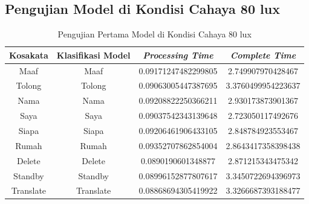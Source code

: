 \subsection{Pengujian Model di Kondisi Cahaya 80 lux}
\label{sec:analisiscahaya2}

\begin{longtable}{|c|c|c|c|}
  \caption{Pengujian Pertama Model di Kondisi Cahaya 80 lux}
  \label{tb:prediksiremang1}                                   \\
  \hline
  \rowcolor[HTML]{C0C0C0}
  \textbf{Kosakata} & \textbf{Klasifikasi Model} & \textbf{\emph{Processing Time}} & \textbf{\emph{Complete Time}}\\
  \hline
  Maaf              & Maaf                        & 0.09171247482299805                           & 2.749907970428467                                  \\
  Tolong            & Tolong                        & 0.09063005447387695                           & 3.3760499954223637                                  \\
  Nama              & Nama                        & 0.09208822250366211                           & 2.930173873901367                                  \\
  Saya              & Saya                        & 0.09037542343139648                           & 2.723050117492676                                  \\
  Siapa              & Siapa                        & 0.09206461906433105                           & 2.848784923553467                                  \\
  Rumah             & Rumah                        & 0.09352707862854004                           & 2.8643417358398438                                  \\
  Delete            & Delete                        & 0.0890190601348877                            & 2.871215343475342                                  \\
  Standby           & Standby                        & 0.08996152877807617                           & 3.3450722694396973                                  \\
  Translate         & Translate                        & 0.08868694305419922                           & 3.3266687393188477                                  \\
  \hline
\end{longtable}

